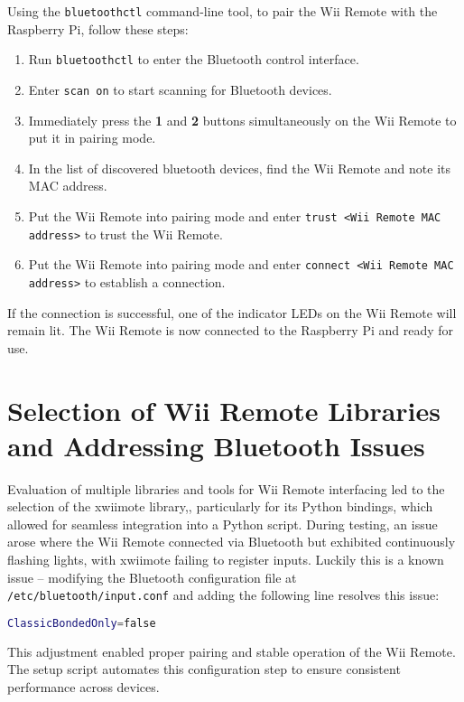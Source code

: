 Using the \texttt{bluetoothctl}\cite{bluetoothctl} command-line tool, to pair the Wii Remote with the Raspberry Pi, follow these steps:

\begin{enumerate}
	\item Run \texttt{bluetoothctl} to enter the Bluetooth control interface.
	\item Enter \texttt{scan on} to start scanning for Bluetooth devices.
	\item Immediately press the \textbf{1} and \textbf{2} buttons simultaneously on the Wii Remote to put it in pairing mode.
	\item In the list of discovered bluetooth devices, find the Wii Remote and note its MAC address.
	\item Put the Wii Remote into pairing mode and enter \texttt{trust <Wii Remote MAC address>} to trust the Wii Remote.
	\item Put the Wii Remote into pairing mode and enter \texttt{connect <Wii Remote MAC address>} to establish a connection.
\end{enumerate}

If the connection is successful, one of the indicator LEDs on the Wii Remote will remain lit. The Wii Remote is now connected to the Raspberry Pi and ready for use.

\section{Selection of Wii Remote Libraries and Addressing Bluetooth Issues}

Evaluation of multiple libraries and tools for Wii Remote interfacing led to the selection of the xwiimote\cite{xwiimote} library,, particularly for its Python
bindings\cite{xwiimote_bindings}, which allowed for seamless integration into a
Python script. During testing, an issue arose where the Wii Remote connected via
Bluetooth but exhibited continuously flashing lights, with xwiimote failing to
register inputs. Luckily this is a known issue\cite{xwiimote_issue} -- modifying
the Bluetooth configuration file at \texttt{/etc/bluetooth/input.conf} and
adding the following line resolves this issue:

\begin{lstlisting}[language=bash]
ClassicBondedOnly=false
\end{lstlisting}

This adjustment enabled proper pairing and stable operation of the Wii Remote. The setup script automates this configuration step to ensure consistent performance across devices.

